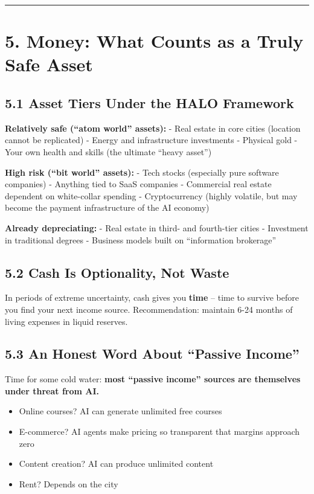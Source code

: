 \begin{center}\rule{0.5\linewidth}{0.5pt}\end{center}

\section{5. Money: What Counts as a Truly Safe
Asset}\label{money-what-counts-as-a-truly-safe-asset}

\subsection{5.1 Asset Tiers Under the HALO
Framework}\label{asset-tiers-under-the-halo-framework}

\textbf{Relatively safe (``atom world'' assets):} - Real estate in core
cities (location cannot be replicated) - Energy and infrastructure
investments - Physical gold - Your own health and skills (the ultimate
``heavy asset'')

\textbf{High risk (``bit world'' assets):} - Tech stocks (especially
pure software companies) - Anything tied to SaaS companies - Commercial
real estate dependent on white-collar spending - Cryptocurrency (highly
volatile, but may become the payment infrastructure of the AI economy)

\textbf{Already depreciating:} - Real estate in third- and fourth-tier
cities - Investment in traditional degrees - Business models built on
``information brokerage''

\subsection{5.2 Cash Is Optionality, Not
Waste}\label{cash-is-optionality-not-waste}

In periods of extreme uncertainty, cash gives you \textbf{time} -- time
to survive before you find your next income source. Recommendation:
maintain 6-24 months of living expenses in liquid reserves.

\subsection{5.3 An Honest Word About ``Passive
Income''}\label{an-honest-word-about-passive-income}

Time for some cold water: \textbf{most ``passive income'' sources are
themselves under threat from AI.}

\begin{itemize}
\tightlist
\item
  Online courses? AI can generate unlimited free courses
\item
  E-commerce? AI agents make pricing so transparent that margins
  approach zero
\item
  Content creation? AI can produce unlimited content
\item
  Rent? Depends on the city
\end{itemize}

